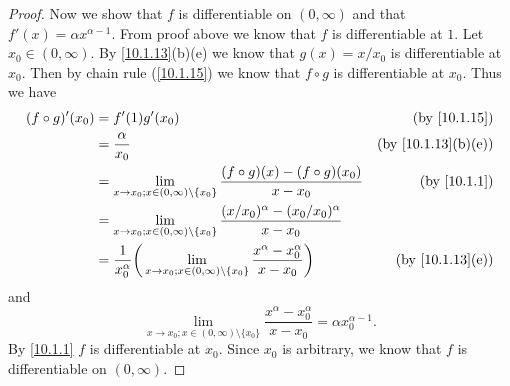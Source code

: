 \begin{proof}
  Now we show that \(f\) is differentiable on \((0, \infty)\) and that \(f'(x) = \alpha x^{\alpha - 1}\).
  From proof above we know that \(f\) is differentiable at \(1\).
  Let \(x_0 \in (0, \infty)\).
  By \cref{10.1.13}(b)(e) we know that \(g(x) = x / x_0\) is differentiable at \(x_0\).
  Then by chain rule (\cref{10.1.15}) we know that \(f \circ g\) is differentiable at \(x_0\).
  Thus we have
  \begin{align*}
    (f \circ g)'(x_0) & = f'(1) g'(x_0)                                                                                                                       & \text{(by \cref{10.1.15})}       \\
                      & = \frac{\alpha}{x_0}                                                                                                                  & \text{(by \cref{10.1.13}(b)(e))} \\
                      & = \lim_{x \to x_0 ; x \in (0, \infty) \setminus \{x_0\}} \frac{(f \circ g)(x) - (f \circ g)(x_0)}{x - x_0}                            & \text{(by \cref{10.1.1})}        \\
                      & = \lim_{x \to x_0 ; x \in (0, \infty) \setminus \{x_0\}} \frac{(x / x_0)^{\alpha} - (x_0 / x_0)^{\alpha}}{x - x_0}                                                       \\
                      & = \frac{1}{x_0^{\alpha}} \bigg(\lim_{x \to x_0 ; x \in (0, \infty) \setminus \{x_0\}} \frac{x^{\alpha} - x_0^{\alpha}}{x - x_0}\bigg) & \text{(by \cref{10.1.13}(e))}
  \end{align*}
  and
  \[
    \lim_{x \to x_0 ; x \in (0, \infty) \setminus \{x_0\}} \frac{x^{\alpha} - x_0^{\alpha}}{x - x_0} = \alpha x_0^{\alpha - 1}.
  \]
  By \cref{10.1.1} \(f\) is differentiable at \(x_0\).
  Since \(x_0\) is arbitrary, we know that \(f\) is differentiable on \((0, \infty)\).
\end{proof}
